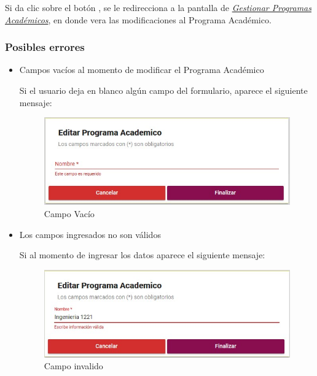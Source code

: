         Si da clic sobre el botón , se le redirecciona a la pantalla de \hyperlink{consultarpa}{\textit{Gestionar Programas Académicos}}, en donde vera las modificaciones al Programa Académico.\\

        \subsubsection{Posibles errores}

            \begin{itemize}
            	\item Campos vacíos al momento de modificar el Programa Académico

                	Si el usuario deja en blanco algún campo del formulario, aparece el siguiente mensaje:

                    \begin{figure}[H]
                    \centering
                    \hypertarget{vacio}{\includegraphics[width=0.7\linewidth]{images/SP3/Vacio}}
                    \caption{Campo Vacío}
                    \label{vacio}
                    \end{figure}

            	\item Los campos ingresados no son válidos

                	Si al momento de ingresar los datos aparece el siguiente mensaje:

                     \begin{figure}[H]
                    \centering
                    \hypertarget{invalido}{\includegraphics[width=0.7\linewidth]{images/SP3/Invalida}}
                    \caption{Campo invalido}
                    \label{invalido}
                    \end{figure}



\end{itemize}
